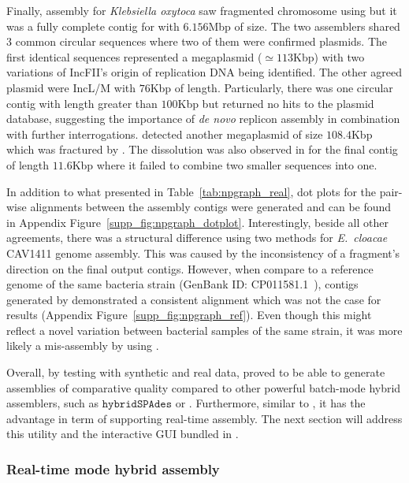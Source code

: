 Finally, assembly for \emph{Klebsiella oxytoca} saw fragmented chromosome using \unicycler{} but it was a fully complete contig for \npgraph{} with $6.156$Mbp of size.
The two assemblers shared 3 common circular sequences where two of them were confirmed plasmids. 
The first identical sequences represented a megaplasmid ($\simeq 113$Kbp) with two variations of IncFII's origin of replication DNA being identified. 
The other agreed plasmid were IncL/M with $76$Kbp of length.
Particularly, there was one circular contig with length greater than $100$Kbp but returned no hits to the plasmid database, suggesting the importance of \emph{de novo} replicon assembly in combination with further interrogations.
\unicycler{} detected another megaplasmid of size $108.4$Kbp which was fractured by \npgraph{}. 
The dissolution was also observed in \npgraph{} for the final contig of length $11.6$Kbp where it failed to combine two smaller sequences into one.

In addition to what presented in Table~\ref{tab:npgraph_real}, dot plots for the pair-wise alignments between the assembly contigs were generated and can be found in Appendix Figure~\ref{supp_fig:npgraph_dotplot}. Interestingly, beside all other agreements, there was a structural difference using two methods for \emph{E.~cloacae} CAV1411 genome assembly. This was caused by the inconsistency of a fragment's direction on the final output contigs. However, when compare to a reference genome of the same bacteria strain (GenBank ID: CP011581.1~\cite{Potter2016rapid}), contigs generated by \npgraph{} demonstrated a consistent alignment which was not the case for \unicycler{} results (Appendix Figure~\ref{supp_fig:npgraph_ref}). Even though this might reflect a novel variation between bacterial samples of the same strain, it was more likely a mis-assembly by using \unicycler{}.

Overall, by testing with synthetic and real data, \npgraph{} proved to be able to generate assemblies of comparative quality compared to other powerful batch-mode hybrid assemblers, such as $\mathtt{hybridSPAdes}$ or \unicycler{}.
Furthermore, similar to \npscarf{}, it has the advantage in term of supporting real-time assembly. The next section will address this utility and the interactive GUI bundled in \npgraph{}. 

\subsubsection{Real-time mode hybrid assembly}

